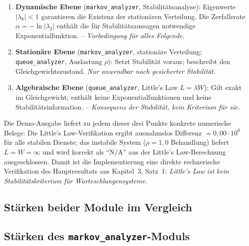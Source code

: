 ﻿\documentclass[a4paper,12pt]{report}
\theoremstyle{definition}
\begin{document}
\begin{enumerate}
	\item[-] \textbf{Dynamische Ebene} (\texttt{markov\_analyzer},
	Stabilitätsanalyse): Eigenwerte $|\lambda_k| < 1$ garantieren
	die Existenz der stationären Verteilung. Die Zerfallsrate
	$\alpha = -\ln|\lambda_2|$ enthält die für Stabilitätsaussagen
	notwendige Exponentialfunktion. -- \emph{Vorbedingung für alles Folgende.}
	
	\item[-] \textbf{Stationäre Ebene} (\texttt{markov\_analyzer},
	stationäre Verteilung; \texttt{queue\_analyzer}, Auslastung $\rho$):
	Setzt Stabilität voraus; beschreibt den Gleichgewichtszustand.
	\emph{Nur anwendbar nach gesicherter Stabilität.}
	
	\item[-] \textbf{Algebraische Ebene} (\texttt{queue\_analyzer},
	Little's Law $L = \lambda W$): Gilt exakt im Gleichgewicht;
	enthält keine Exponentialfunktionen und keine Stabilitätsinformation.
	-- \emph{Konsequenz der Stabilität, kein Kriterium für sie.}
\end{enumerate}

Die Demo-Ausgabe liefert zu jedem dieser drei Punkte konkrete numerische
Belege: Die Little's Law-Verifikation ergibt ausnahmslos Differenz
$= 0{,}00 \cdot 10^0$ für alle stabilen Dienste; das instabile System
($\rho = 1{,}0$ Behandlung) liefert $L = W = \infty$ und wird korrekt
als ``N/A'' aus der Little's Law-Berechnung ausgeschlossen.
Damit ist die Implementierung eine direkte rechnerische Verifikation
des Hauptresultats aus Kapitel~3, Satz~1: \emph{Little's Law
	ist kein Stabilitätskriterium für Warteschlangensysteme.}

\subsection{Stärken beider Module im Vergleich}
\label{sec:module-staerken}

\subsection{Stärken des \texttt{markov\_analyzer}-Moduls}
\end{document}
